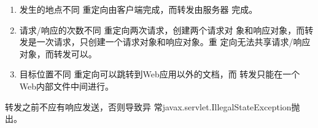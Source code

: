 \begin{enumerate}
\item {\hei 发生的地点不同} {\kai 重定向由客户端完成，而转发由服务器
    完成。}
\item {\hei 请求/响应的次数不同} {\kai 重定向两次请求，创建两个请求对
    象和响应对象，而转发是一次请求，只创建一个请求对象和响应对象。重
    定向无法共享请求/响应对象，而转发可以。}
\item {\hei 目标位置不同} {\kai 重定向可以跳转到Web应用以外的文档，而
    转发只能在一个Web内部文件中间进行。}
\end{enumerate}


转发之前不应有响应发送，否则导致异
常javax.servlet.IllegalStateException抛出。

